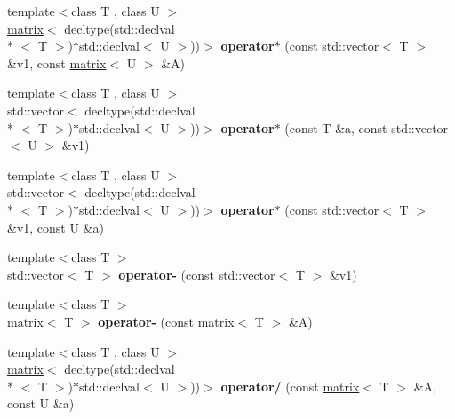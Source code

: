 \begin{DoxyCompactItemize}
\item 
\hypertarget{namespacekeycpp_a6dcf10b0db68d53d126803e8d6d591fb}{{\footnotesize template$<$class T , class U $>$ }\\\hyperlink{classkeycpp_1_1matrix}{matrix}$<$ decltype(std\-::declval\\*
$<$ T $>$)$\ast$std\-::declval$<$ U $>$))$>$ {\bfseries operator$\ast$} (const std\-::vector$<$ T $>$ \&v1, const \hyperlink{classkeycpp_1_1matrix}{matrix}$<$ U $>$ \&A)}\label{namespacekeycpp_a6dcf10b0db68d53d126803e8d6d591fb}

\item 
\hypertarget{namespacekeycpp_a4b523ff3dd5abac240788f6efb2e554e}{{\footnotesize template$<$class T , class U $>$ }\\std\-::vector$<$ decltype(std\-::declval\\*
$<$ T $>$)$\ast$std\-::declval$<$ U $>$))$>$ {\bfseries operator$\ast$} (const T \&a, const std\-::vector$<$ U $>$ \&v1)}\label{namespacekeycpp_a4b523ff3dd5abac240788f6efb2e554e}

\item 
\hypertarget{namespacekeycpp_aa2e9a06b12f7df18005a3daa3c051b2c}{{\footnotesize template$<$class T , class U $>$ }\\std\-::vector$<$ decltype(std\-::declval\\*
$<$ T $>$)$\ast$std\-::declval$<$ U $>$))$>$ {\bfseries operator$\ast$} (const std\-::vector$<$ T $>$ \&v1, const U \&a)}\label{namespacekeycpp_aa2e9a06b12f7df18005a3daa3c051b2c}

\item 
\hypertarget{namespacekeycpp_ac2665554c04ea23aad98e77d1618ca6b}{{\footnotesize template$<$class T $>$ }\\std\-::vector$<$ T $>$ {\bfseries operator-\/} (const std\-::vector$<$ T $>$ \&v1)}\label{namespacekeycpp_ac2665554c04ea23aad98e77d1618ca6b}

\item 
\hypertarget{namespacekeycpp_a390125160a7febd08d5c30629f4f698f}{{\footnotesize template$<$class T $>$ }\\\hyperlink{classkeycpp_1_1matrix}{matrix}$<$ T $>$ {\bfseries operator-\/} (const \hyperlink{classkeycpp_1_1matrix}{matrix}$<$ T $>$ \&A)}\label{namespacekeycpp_a390125160a7febd08d5c30629f4f698f}

\item 
\hypertarget{namespacekeycpp_a3852c35cfcc8caa784465a26d04c68a1}{{\footnotesize template$<$class T , class U $>$ }\\\hyperlink{classkeycpp_1_1matrix}{matrix}$<$ decltype(std\-::declval\\*
$<$ T $>$)$\ast$std\-::declval$<$ U $>$))$>$ {\bfseries operator/} (const \hyperlink{classkeycpp_1_1matrix}{matrix}$<$ T $>$ \&A, const U \&a)}\label{namespacekeycpp_a3852c35cfcc8caa784465a26d04c68a1}


\end{DoxyCompactItemize}

